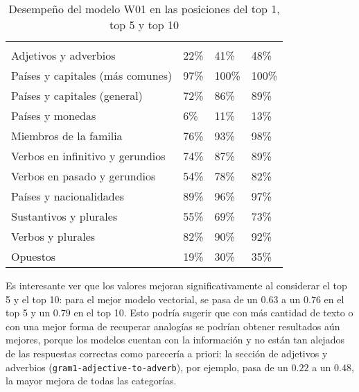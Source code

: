 \begin{table}[!h]
    \setlength\tabcolsep{4pt}
    \begin{tabularx}{\textwidth}{l*{3}{Z}}
        \toprule
        \midrule
         &  &  & \\
        Adjetivos y adverbios & 22\% & 41\% & 48\%\\
        Países y capitales (más comunes) & 97\% & 100\% & 100\%\\
        Países y capitales (general) & 72\% & 86\% & 89\%\\
        Países y monedas & 6\% & 11\% & 13\%\\
        Miembros de la familia & 76\% & 93\% & 98\%\\
        Verbos en infinitivo y gerundios & 74\% & 87\% & 89\%\\
        Verbos en pasado y gerundios & 54\% & 78\% & 82\%\\
        Países y nacionalidades & 89\% & 96\% & 97\%\\
        Sustantivos y plurales & 55\% & 69\% & 73\%\\
        Verbos y plurales & 82\% & 90\% & 92\%\\
        Opuestos & 19\% & 30\% & 35\%\\
        \midrule
        \bottomrule
    \end{tabularx}
    \caption{Desempeño del modelo W01 en las posiciones del top 1, top 5 y top 10}
    \label{table:top_1_5_10}
\end{table}

Es interesante ver que los valores mejoran significativamente al considerar el top 5 y el top 10:
para el mejor modelo vectorial, se pasa de un $0.63$ a un $0.76$ en el top 5 y un $0.79$ en el top
10. Esto podría sugerir que con más cantidad de texto o con una mejor forma de recuperar analogías
se podrían obtener resultados aún mejores, porque los modelos cuentan con la información y no están
tan alejados de las respuestas correctas como parecería a priori: la sección
de adjetivos y adverbios (\texttt{gram1-adjective-to-adverb}), por ejemplo, pasa de un $0.22$ a un
$0.48$, la mayor mejora de todas las categorías.

